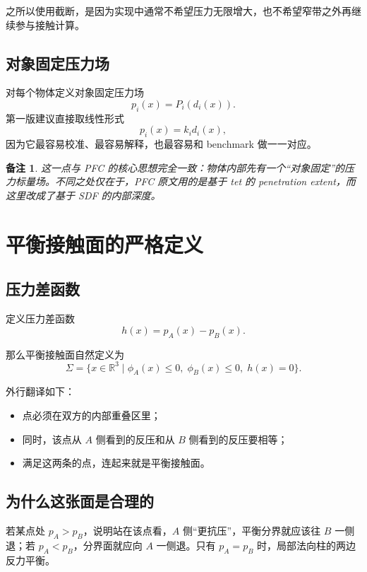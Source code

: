 \documentclass[12pt,a4paper]{ctexart}
\newtheorem{remark}{备注}
\begin{document}
之所以使用截断，是因为实现中通常不希望压力无限增大，也不希望窄带之外再继续参与接触计算。

\subsection{对象固定压力场}
对每个物体定义对象固定压力场
\begin{equation}
    p_i(x)=P_i(d_i(x)).
\end{equation}
第一版建议直接取线性形式
\begin{equation}
    p_i(x)=k_i d_i(x),
\end{equation}
因为它最容易校准、最容易解释，也最容易和 benchmark 做一一对应。

\begin{remark}
这一点与 PFC 的核心思想完全一致：物体内部先有一个“对象固定”的压力标量场。不同之处仅在于，PFC 原文用的是基于 tet 的 penetration extent，而这里改成了基于 SDF 的内部深度。
\end{remark}

\section{平衡接触面的严格定义}

\subsection{压力差函数}
定义压力差函数
\begin{equation}
    h(x)=p_A(x)-p_B(x).
\end{equation}

那么平衡接触面自然定义为
\begin{equation}
    \Sigma=\bigl\{x\in\mathbb R^3\mid \phi_A(x)\le 0,\;\phi_B(x)\le 0,\;h(x)=0\bigr\}.
\end{equation}

外行翻译如下：
\begin{itemize}
    \item 点必须在双方的内部重叠区里；
    \item 同时，该点从 $A$ 侧看到的反压和从 $B$ 侧看到的反压要相等；
    \item 满足这两条的点，连起来就是平衡接触面。
\end{itemize}

\subsection{为什么这张面是合理的}
若某点处 $p_A>p_B$，说明站在该点看，$A$ 侧“更抗压”，平衡分界就应该往 $B$ 一侧退；若 $p_A<p_B$，分界面就应向 $A$ 一侧退。只有 $p_A=p_B$ 时，局部法向柱的两边反力平衡。
\end{document}

